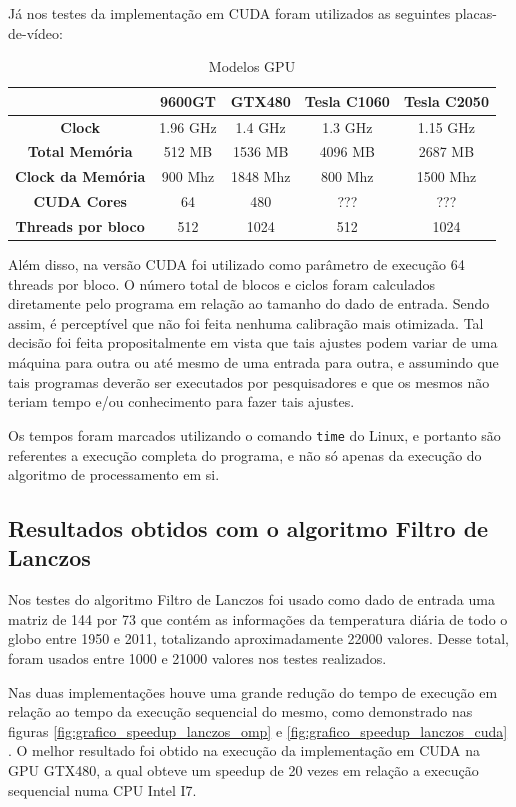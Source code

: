 Já nos testes da implementação em CUDA foram utilizados as seguintes placas-de-vídeo:

\begin{table}[H]
\caption{Modelos GPU}
\begin{center}
\begin{tabular}{ccccc}
 & \textbf{9600GT} & \textbf{GTX480} & \textbf{Tesla C1060} & \textbf{Tesla C2050}\\
\hline\hline
\textbf{Clock}				& 1.96 GHz	& 1.4 GHz 	& 1.3 GHz	& 1.15 GHz \\
\textbf{Total Memória}		& 512 MB		& 1536 MB	& 4096 MB	& 2687 MB \\
\textbf{Clock da Memória}	& 900 Mhz	& 1848 Mhz 	& 800 Mhz	& 1500 Mhz \\
\textbf{CUDA Cores}			& 64			& 480		& ???		& ??? \\
\textbf{Threads por bloco}	& 512		& 1024		& 512		& 1024
\end{tabular} 
\end{center}
\end{table}

Além disso, na versão CUDA foi utilizado como parâmetro de execução 64 threads por bloco. O número total de blocos e ciclos foram calculados diretamente pelo programa em relação ao tamanho do dado de entrada. Sendo assim, é perceptível que não foi feita nenhuma calibração mais otimizada. Tal decisão foi feita propositalmente em vista que tais ajustes podem variar de uma máquina para outra ou até mesmo de uma entrada para outra, e assumindo que tais programas deverão ser executados por pesquisadores e que os mesmos não teriam tempo e/ou conhecimento para fazer tais ajustes.

Os tempos foram marcados utilizando o comando \texttt{time} do Linux, e portanto são referentes a execução completa do programa, e não só apenas da execução do algoritmo de processamento em si.

\subsection{Resultados obtidos com o algoritmo Filtro de Lanczos}

Nos testes do algoritmo Filtro de Lanczos foi usado como dado de entrada uma matriz de 144 por 73 que contém as informações da temperatura diária de todo o globo entre 1950 e 2011, totalizando aproximadamente 22000 valores. Desse total, foram usados entre 1000 e 21000 valores nos testes realizados.

Nas duas implementações houve uma grande redução do tempo de execução em relação ao tempo da execução sequencial do mesmo, como demonstrado nas figuras \ref{fig:grafico_speedup_lanczos_omp} e \ref{fig:grafico_speedup_lanczos_cuda} . O melhor resultado foi obtido na execução da implementação em CUDA na GPU GTX480, a qual obteve um speedup de 20 vezes em relação a execução sequencial numa CPU Intel I7.

